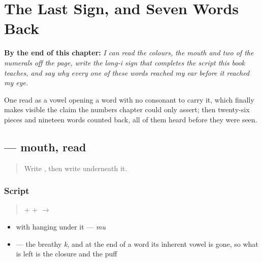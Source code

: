 
\chapter{The Last Sign, and Seven Words Back}
\label{ch:bn-last-sign-seven-words}

\begin{chapteropening}
\textbf{By the end of this chapter:} \emph{I can read the colours, the mouth and two of the numerals off the page, write the long-i sign that completes the script this book teaches, and say why every one of these words reached my ear before it reached my eye.}

One read as a vowel opening a word with no consonant to carry it, which finally makes visible the claim the numbers chapter could only assert; then twenty-six pieces and nineteen words counted back, all of them heard before they were seen.
\end{chapteropening}

\section[mukh]{ — mouth, read}

\label{lesson:BN-W03-mukh-read}



\begin{quote}
Write \textbf{}, then write \textbf{} underneath it.
\end{quote}

\subsection*{Script}
\begin{quote}
\textbf{} + \textbf{} + \textbf{} $\to$ \textbf{}
\end{quote}

\begin{itemize}
\raggedright
  \item \textbf{} with \textbf{} hanging under it — \emph{mu}
  \item \textbf{} — the breathy \emph{k}, and at the end of a word its inherent vowel is gone, so what is left is the closure and the puff
\end{itemize}

